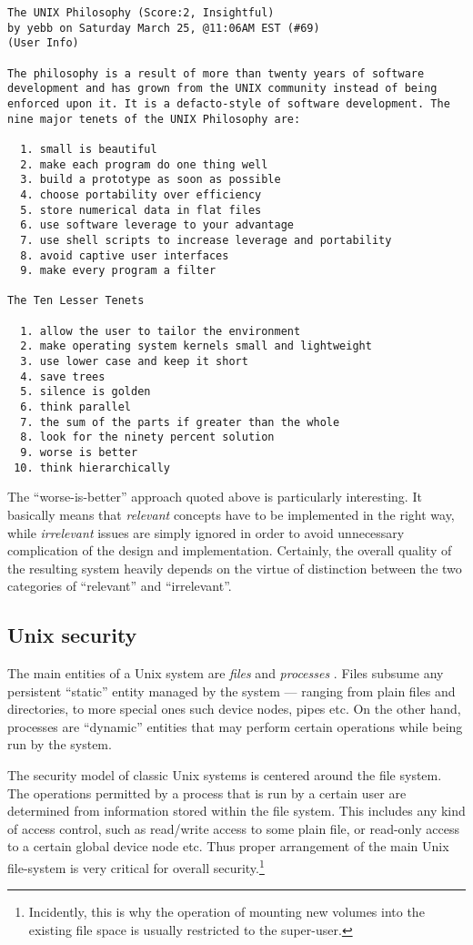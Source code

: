 \documentclass[11pt,a4paper]{article}
\begin{document}
{\small
\begin{verbatim}
The UNIX Philosophy (Score:2, Insightful)
by yebb on Saturday March 25, @11:06AM EST (#69)
(User Info) 

The philosophy is a result of more than twenty years of software
development and has grown from the UNIX community instead of being
enforced upon it. It is a defacto-style of software development. The
nine major tenets of the UNIX Philosophy are:

  1. small is beautiful 
  2. make each program do one thing well 
  3. build a prototype as soon as possible 
  4. choose portability over efficiency 
  5. store numerical data in flat files 
  6. use software leverage to your advantage 
  7. use shell scripts to increase leverage and portability 
  8. avoid captive user interfaces 
  9. make every program a filter 

The Ten Lesser Tenets 

  1. allow the user to tailor the environment 
  2. make operating system kernels small and lightweight 
  3. use lower case and keep it short 
  4. save trees 
  5. silence is golden 
  6. think parallel 
  7. the sum of the parts if greater than the whole 
  8. look for the ninety percent solution 
  9. worse is better 
 10. think hierarchically 
\end{verbatim}
}

The ``worse-is-better'' approach quoted above is particularly interesting.  It
basically means that \emph{relevant} concepts have to be implemented in the
right way, while \emph{irrelevant} issues are simply ignored in order to avoid
unnecessary complication of the design and implementation.  Certainly, the
overall quality of the resulting system heavily depends on the virtue of
distinction between the two categories of ``relevant'' and ``irrelevant''.


\subsection{Unix security}

The main entities of a Unix system are \emph{files} and \emph{processes}
\cite{Tanenbaum:1992}.  Files subsume any persistent ``static'' entity managed
by the system --- ranging from plain files and directories, to more special
ones such device nodes, pipes etc.  On the other hand, processes are
``dynamic'' entities that may perform certain operations while being run by
the system.

The security model of classic Unix systems is centered around the file system.
The operations permitted by a process that is run by a certain user are
determined from information stored within the file system.  This includes any
kind of access control, such as read/write access to some plain file, or
read-only access to a certain global device node etc.  Thus proper arrangement
of the main Unix file-system is very critical for overall
security.\footnote{Incidently, this is why the operation of mounting new
  volumes into the existing file space is usually restricted to the
  super-user.}
\end{document}
